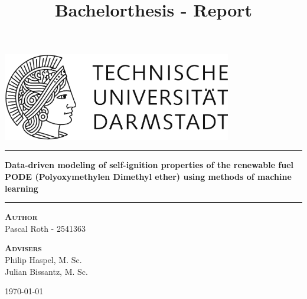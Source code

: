 \documentclass[12pt,oneside,a4paper,english]{article}
\title{Bachelorthesis - Report} %
\begin{document}

\begin{titlepage}
\begin{center}
\vspace{2cm}
\includegraphics[width=0.75\textwidth]{Darmstadt.png}~\\[1cm]
\vspace{1cm}

\vspace{2cm}

\hrule
\vspace{.5cm}
{ \huge \bfseries Data-driven modeling of self-ignition properties of the renewable fuel PODE (Polyoxymethylen Dimethyl ether) using methods of machine learning} %
\vspace{.5cm}

\hrule
\vspace{1.5cm}

\textsc{\textbf{Author}}\\
\vspace{.5cm}
\centering
Pascal Roth - 2541363\\
\vspace{1.5cm}

\textsc{\textbf{Advisers}}\\
\vspace{.5cm}
\centering
Philip Haspel, M. Sc.\\
Julian Bissantz, M. Sc. 
\vspace{1.5cm}

\centering \today %
\end{center}
\end{titlepage}

\newpage
\doublespacing
\renewcommand{\baselinestretch}{1}\normalsize
\tableofcontents
\renewcommand{\baselinestretch}{1}\normalsize
\thispagestyle{fancy} %

\newpage
\end{document}
